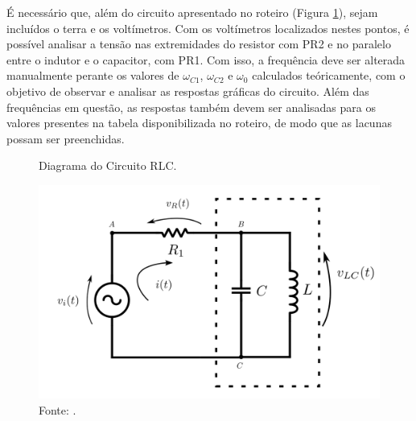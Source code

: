 É necessário que, além do circuito apresentado no roteiro (Figura \ref{circuitoRoteiro}), sejam incluídos o terra e os voltímetros. Com os voltímetros localizados nestes pontos, é possível analisar a tensão nas extremidades do resistor com PR2 e no paralelo entre o indutor e o capacitor, com PR1. Com isso, a frequência deve ser alterada manualmente perante os valores de $\omega_{C1}$, $\omega_{C2}$ e $\omega_0$ calculados teóricamente, com o objetivo de observar e analisar as respostas gráficas do circuito. Além das frequências em questão, as respostas também devem ser analisadas para os valores presentes na tabela disponibilizada no roteiro, de modo que as lacunas possam ser preenchidas.

\begin{figure}[H]
	\centering
	\caption{Diagrama do Circuito RLC.}
	\includegraphics[width=15cm]{imagens/circuitoRoteiro.png}
	\caption*{Fonte: \cite{roteiro4}.}
	\label{circuitoRoteiro}
\end{figure}

\pagebreak